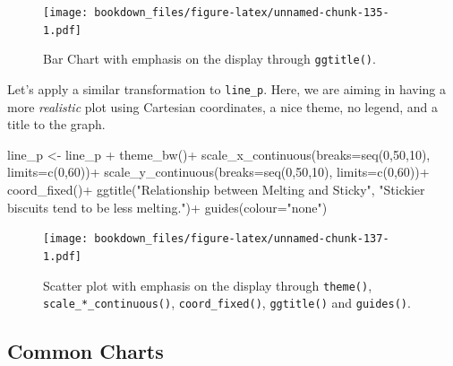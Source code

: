 \documentclass[
]{krantz}
\makeatletter
\newenvironment{Shaded}{\begin{snugshade}}{\end{snugshade}}
\newcommand{\AttributeTok}[1]{\textcolor[rgb]{0.61,0.61,0.61}{#1}}
\newcommand{\DecValTok}[1]{\textcolor[rgb]{0.06,0.06,0.06}{#1}}
\newcommand{\FunctionTok}[1]{\textcolor[rgb]{0,0,0}{#1}}
\newcommand{\NormalTok}[1]{#1}
\newcommand{\OtherTok}[1]{\textcolor[rgb]{0.37,0.37,0.37}{#1}}
\newcommand{\SpecialCharTok}[1]{\textcolor[rgb]{0,0,0}{#1}}
\newcommand{\StringTok}[1]{\textcolor[rgb]{0.5,0.5,0.5}{#1}}
\newenvironment{kframe}{%
\medskip{}
\setlength{\fboxsep}{.8em}
 \def\at@end@of@kframe{}%
 \ifinner\ifhmode%
  \def\at@end@of@kframe{\end{minipage}}%
  \begin{minipage}{\columnwidth}%
 \fi\fi%
 \def\FrameCommand##1{\hskip\@totalleftmargin \hskip-\fboxsep
 \colorbox{shadecolor}{##1}\hskip-\fboxsep
     \hskip-\linewidth \hskip-\@totalleftmargin \hskip\columnwidth}%
 \MakeFramed {\advance\hsize-\width
   \@totalleftmargin\z@ \linewidth\hsize
   \@setminipage}}%
 {\par\unskip\endMakeFramed%
 \at@end@of@kframe}
\renewenvironment{Shaded}{\begin{kframe}}{\end{kframe}}
\makeatother
\begin{document}
\begin{figure}
\centering
\texttt{[image: bookdown\_files/figure-latex/unnamed-chunk-135-1.pdf]}
\caption{\label{fig:unnamed-chunk-135}Bar Chart with emphasis on the display through \texttt{ggtitle()}.}
\end{figure}

Let's apply a similar transformation to \texttt{line\_p}. Here, we are aiming in having a more \emph{realistic} plot using Cartesian coordinates, a nice theme, no legend, and a title to the graph.

\begin{Shaded}
\begin{Highlighting}[]
\NormalTok{line\_p }\OtherTok{\textless{}{-}}\NormalTok{ line\_p }\SpecialCharTok{+}
  \FunctionTok{theme\_bw}\NormalTok{()}\SpecialCharTok{+}
  \FunctionTok{scale\_x\_continuous}\NormalTok{(}\AttributeTok{breaks=}\FunctionTok{seq}\NormalTok{(}\DecValTok{0}\NormalTok{,}\DecValTok{50}\NormalTok{,}\DecValTok{10}\NormalTok{), }\AttributeTok{limits=}\FunctionTok{c}\NormalTok{(}\DecValTok{0}\NormalTok{,}\DecValTok{60}\NormalTok{))}\SpecialCharTok{+}
  \FunctionTok{scale\_y\_continuous}\NormalTok{(}\AttributeTok{breaks=}\FunctionTok{seq}\NormalTok{(}\DecValTok{0}\NormalTok{,}\DecValTok{50}\NormalTok{,}\DecValTok{10}\NormalTok{), }\AttributeTok{limits=}\FunctionTok{c}\NormalTok{(}\DecValTok{0}\NormalTok{,}\DecValTok{60}\NormalTok{))}\SpecialCharTok{+}
  \FunctionTok{coord\_fixed}\NormalTok{()}\SpecialCharTok{+}
  \FunctionTok{ggtitle}\NormalTok{(}\StringTok{"Relationship between Melting and Sticky"}\NormalTok{,}
          \StringTok{"Stickier biscuits tend to be less melting."}\NormalTok{)}\SpecialCharTok{+}
  \FunctionTok{guides}\NormalTok{(}\AttributeTok{colour=}\StringTok{"none"}\NormalTok{)}
\end{Highlighting}
\end{Shaded}

\begin{figure}
\centering
\texttt{[image: bookdown\_files/figure-latex/unnamed-chunk-137-1.pdf]}
\caption{\label{fig:unnamed-chunk-137}Scatter plot with emphasis on the display through \texttt{theme()}, \texttt{scale\_*\_continuous()}, \texttt{coord\_fixed()}, \texttt{ggtitle()} and \texttt{guides()}.}
\end{figure}

\hypertarget{common-charts}{%
\subsection{Common Charts}\label{common-charts}}
\end{document}
